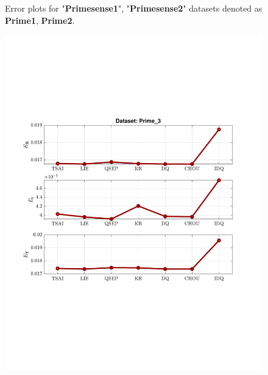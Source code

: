 \begin{figure}
\caption{Error plots for "\textbf{Primesense{\textunderscore}1}", "\textbf{Primesense{\textunderscore}2}" datasets denoted as \textbf{Prime{\textunderscore}1}, \textbf{Prime{\textunderscore}2}.}
\end{figure}

\begin{figure}
\centering
\includegraphics[scale=0.7]{./hand_eye_figures/real/Result_Prime_3}

\end{figure}
